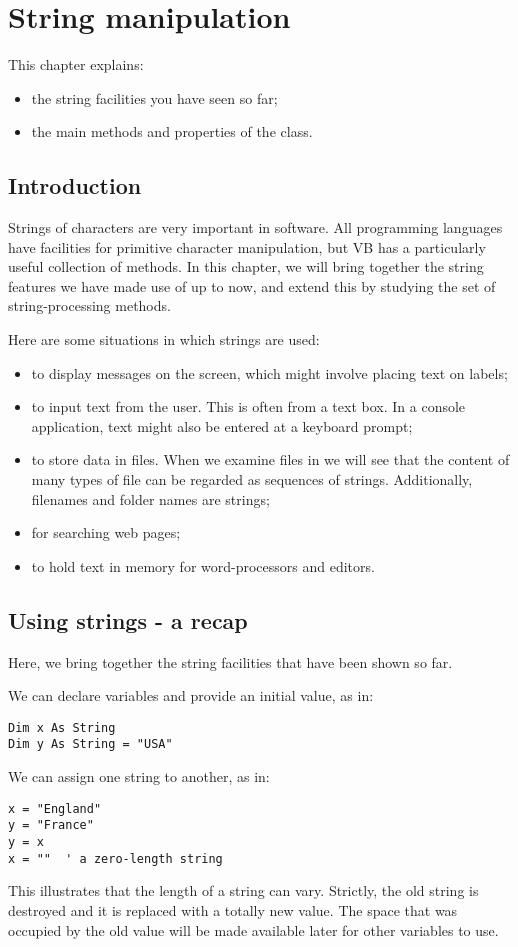 \chapter{String manipulation}
	\label{ch:strings}

	This chapter explains:
	\begin{itemize}
    \item the string facilities you have seen so far;
    \item the main methods and properties of the  class.
	\end{itemize}


	\section{Introduction}
		Strings of characters are very important in software. All programming languages have facilities for primitive character manipulation, but VB has a particularly useful collection of methods. In this chapter, we will bring together the string features we have made use of up to now, and extend this by studying the set of string-processing methods.
		
		Here are some situations in which strings are used:
		\begin{itemize}
      \item to display messages on the screen, which might involve placing text on labels;
      \item to input text from the user. This is often from a text box. In a console application, text might also be entered at a keyboard prompt;
			\item to store data in files. When we examine files in  we will see that the content of many types of file can be regarded as sequences of strings. Additionally, filenames and folder names are strings;
      \item for searching web pages;
      \item to hold text in memory for word-processors and editors.
		\end{itemize}

	\section{Using strings - a recap}
		Here, we bring together the string facilities that have been shown so far.
		
		We can declare variables and provide an initial value, as in:
		\begin{lstlisting}
Dim x As String
Dim y As String = "USA"
		\end{lstlisting}
		We can assign one string to another, as in:
		\begin{lstlisting}
x = "England"
y = "France"
y = x
x = ""	' a zero-length string
		\end{lstlisting}
		This illustrates that the length of a string can vary. Strictly, the old string is destroyed and it is replaced with a totally new value. The space that was occupied by the old value will be made available later for other variables to use.
		
